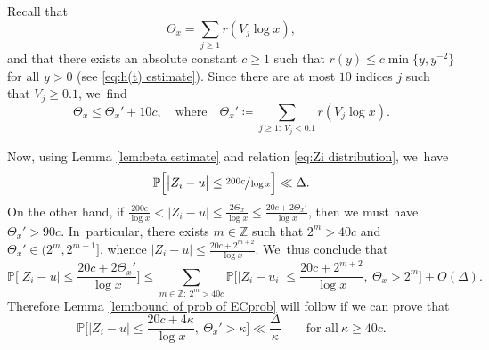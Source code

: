 \documentclass[JEP,XML,SOM,Unicode,published]{cedram}
\newcommand{\ZZ}{\mathbb{Z}}
\newcommand{\PP}{\mathbb{P}}
\newcommand{\bg}{\big}
\newcommand{\bgg}{\Big}
\theoremstyle{plain}
\theoremstyle{definition}
\begin{document}
Recall that
\[
\Theta_x=\sum_{j\ge1}r(V_j\log x),
\]
and that there exists an absolute constant $c\ge1$ such that $r(y)\le c \min\{y,y^{-2}\}$ for all $y>0$ (see \eqref{eq:h(t) estimate}). Since there are at most $10$ indices $j$ such that $V_j\ge 0.1$, we~find
\[
\Theta_x\le \Theta_x'+10c,\quad\text{where}\quad \Theta_x'\coloneqq \sum_{j\ge1:\ V_j<0.1}r(V_j\log x).
\]

Now, using Lemma \ref{lem:beta estimate} and relation \eqref{eq:Zi distribution}, we~have
\[
\PP\bgg[ \bg| Z_i - u \bg|\le \sfrac{200c}{\log x}\bgg] \ll \Delta.
\]
On the other hand, if $\frac{200c}{\log x}<|Z_i-u|\le \frac{2\Theta_x}{\log x}\le \frac{20c+2\Theta_x'}{\log x}$, then we must have $\Theta_x'>90c$. In~particular, there exists $m\in\ZZ$ such that $2^m>40c$ and $\Theta_x'\in(2^m,2^{m+1}]$, whence $|Z_i-u|\le \frac{20c + 2^{m+2}}{\log x}$. We~thus conclude that
\[
\PP\bgg[ \bg| Z_i - u \bg|\le \frac{20c+2\Theta_x'}{\log x}\bgg] \le \sum_{m\in\ZZ:\ 2^m>40c}
\PP\bgg[ \bg| Z_i - u_i \bg|\le \frac{20c+2^{m+2}}{\log x},\ \Theta_x>2^m\bgg] + O(\Delta).
\]
Therefore Lemma \ref{lem:bound of prob of ECprob} will follow if we can prove that
\begin{equation}
\label{eq:lem Bprob reduction 1}
\PP\bgg[ \bg| Z_i - u \bg|\le \frac{20c+4\kappa}{\log x},\ \Theta_x'>\kappa \bgg] \ll \frac{\Delta}{\kappa}
\qquad\text{for all}\ \kappa\ge 40c.
\end{equation}
\end{document}
